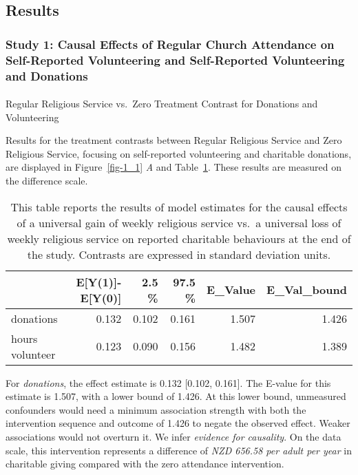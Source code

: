 \documentclass[
  single column]{article}
\makeatletter
\let\oldparagraph\paragraph
\renewcommand{\paragraph}{
    \@ifstar
      \xxxParagraphStar
      \xxxParagraphNoStar
  }
\newcommand{\xxxParagraphStar}[1]{\oldparagraph*{#1}\mbox{}}
\newcommand{\xxxParagraphNoStar}[1]{\oldparagraph{#1}\mbox{}}
\makeatother
\begin{document}
\newpage{}

\subsection{Results}\label{results}

\subsubsection{Study 1: Causal Effects of Regular Church Attendance on
Self-Reported Volunteering and Self-Reported Volunteering and
Donations}\label{study-1-causal-effects-of-regular-church-attendance-on-self-reported-volunteering-and-self-reported-volunteering-and-donations}

\paragraph{Regular Religious Service vs.~Zero Treatment Contrast for
Donations and
Volunteering}\label{regular-religious-service-vs.-zero-treatment-contrast-for-donations-and-volunteering}

Results for the treatment contrasts between Regular Religious Service
and Zero Religious Service, focusing on self-reported volunteering and
charitable donations, are displayed in Figure~\ref{fig-1_1} \emph{A} and
Table~\ref{tbl-1_1}. These results are measured on the difference scale.

\begin{longtable}[]{@{}lrrrrr@{}}

\caption{\label{tbl-1_1}This table reports the results of model
estimates for the causal effects of a universal gain of weekly religious
service vs.~a universal loss of weekly religious service on reported
charitable behaviours at the end of the study. Contrasts are expressed
in standard deviation units.}

\tabularnewline

\toprule\noalign{}
& E{[}Y(1){]}-E{[}Y(0){]} & 2.5 \% & 97.5 \% & E\_Value &
E\_Val\_bound \\
\midrule\noalign{}
\endhead
\bottomrule\noalign{}
\endlastfoot
donations & 0.132 & 0.102 & 0.161 & 1.507 & 1.426 \\
hours volunteer & 0.123 & 0.090 & 0.156 & 1.482 & 1.389 \\

\end{longtable}

For \emph{donations}, the effect estimate is 0.132 {[}0.102, 0.161{]}.
The E-value for this estimate is 1.507, with a lower bound of 1.426. At
this lower bound, unmeasured confounders would need a minimum
association strength with both the intervention sequence and outcome of
1.426 to negate the observed effect. Weaker associations would not
overturn it. We infer \emph{evidence for causality}. On the data scale,
this intervention represents a difference of \emph{NZD 656.58 per adult
per year} in charitable giving compared with the zero attendance
intervention.
\end{document}
